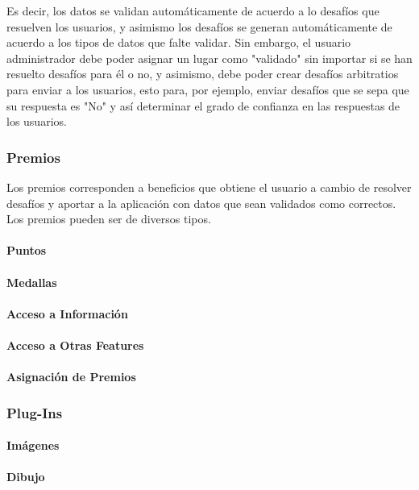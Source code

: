 \documentclass[10pt,letterpaper]{article}
\begin{document}
Es decir, los datos se validan automáticamente de acuerdo a lo desafíos que resuelven los usuarios, y asimismo los desafíos se generan automáticamente de acuerdo a los tipos de datos que falte validar. Sin embargo, el usuario administrador debe poder asignar un lugar como "validado" sin importar si se han resuelto desafíos para él o no, y asimismo, debe poder crear desafíos arbitratios para enviar a los usuarios, esto para, por ejemplo, enviar desafíos que se sepa que su respuesta es "No" y así determinar el grado de confianza en las respuestas de los usuarios.\\

\subsubsection{Premios}

Los premios corresponden a beneficios que obtiene el usuario a cambio de resolver desafíos y aportar a la aplicación con datos que sean validados como correctos. Los premios pueden ser de diversos tipos.\\

\paragraph{Puntos}
\paragraph{Medallas}
\paragraph{Acceso a Información}
\paragraph{Acceso a Otras Features}
\paragraph{Asignación de Premios}

\subsubsection{Plug-Ins}
\paragraph{Imágenes}
\paragraph{Dibujo}
\end{document}
